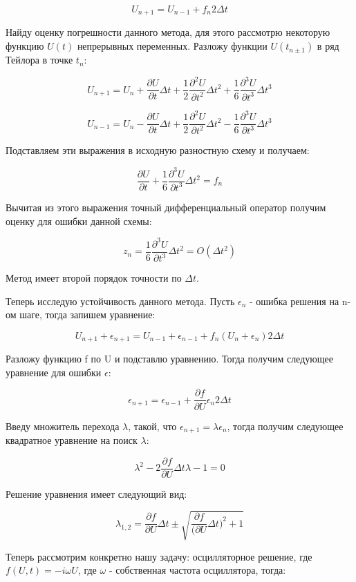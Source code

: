 \documentclass[diploma]{nanolab2015}
\begin{document}
$$U_{n+1} = U_{n-1} + f_{n} 2 \Delta t$$

Найду оценку погрешности данного метода, для этого рассмотрю некоторую функцию $U(t)$ непрерывных переменных. Разложу функции $U(t_{n \pm 1})$ в ряд Тейлора в точке $t_n$:

$$U_{n+1} = U_n + \frac{\partial U}{\partial t} \Delta t + \frac{1}{2} \frac{\partial^2 U}{\partial t^2} \Delta t^2 + \frac{1}{6} \frac{\partial^3 U}{\partial t^3} \Delta t^3$$

$$U_{n-1} = U_n - \frac{\partial U}{\partial t} \Delta t + \frac{1}{2} \frac{\partial^2 U}{\partial t^2} \Delta t^2 - \frac{1}{6} \frac{\partial^3 U}{\partial t^3} \Delta t^3$$

Подставляем эти выражения в исходную разностную схему и получаем:

$$\frac{\partial U}{\partial t} + \frac{1}{6} \frac{\partial^3 U}{\partial t^3} \Delta t^2 = f_n$$

Вычитая из этого выражения точный дифференциальный оператор получим оценку для ошибки данной схемы:

$$z_n = \frac{1}{6} \frac{\partial^3 U}{\partial t^3} \Delta t^2 = O(\Delta t^2)$$

Метод имеет второй порядок точности по $\Delta t$.

Теперь исследую устойчивость данного метода. Пусть $\epsilon_n$ - ошибка решения на n-ом шаге, тогда запишем уравнение:

$$U_{n+1} +  \epsilon_{n+1}= U_{n-1} +   \epsilon_{n-1}+ f_{n}(U_n +   \epsilon_n) 2 \Delta t$$

Разложу функцию f по U и подставлю уравнению. Тогда получим следующее уравнение для ошибки $\epsilon$:

$$\epsilon_{n+1} = \epsilon_{n-1} + \frac{\partial f}{\partial U} \epsilon_n 2 \Delta t$$

Введу множитель перехода $\lambda$, такой, что $\epsilon_{n+1}=\lambda \epsilon_n$, тогда получим следующее квадратное уравнение на поиск $\lambda$:

$$\lambda^2 - 2 \frac{\partial f}{\partial U} \Delta t \lambda - 1 = 0$$

Решение уравнения имеет следующий вид: 

$$\lambda_{1,2} = \frac{\partial f}{\partial U} \Delta t \pm \sqrt{ \frac{\partial f}{(\partial U} \Delta t)^2+1}$$

Теперь рассмотрим конкретно нашу задачу: осцилляторное решение, где $f(U,t) = -i \omega U$, где $\omega$ -  собственная частота осциллятора, тогда:
\end{document}
